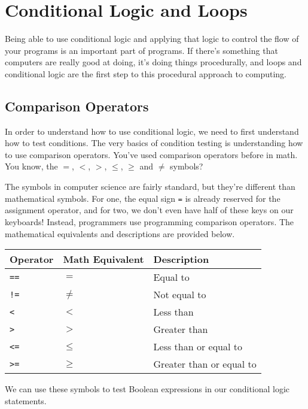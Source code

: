 \chapter{Conditional Logic and Loops}
Being able to use conditional logic and applying that logic to control the flow of your programs is an important part of programs. If there's something that computers are really good at doing, it's doing things procedurally, and loops and conditional logic are the first step to this procedural approach to computing.\par
\section{Comparison Operators}
In order to understand how to use conditional logic, we need to first understand how to test conditions. The very basics of condition testing is understanding how to use comparison operators. You've used comparison operators before in math. You know, the $=$, $<$, $>$, $\leq$, $\geq$ and $\neq$ symbols?\par
The symbols in computer science are fairly standard, but they're different than mathematical symbols. For one, the equal sign \verb|=| is already reserved for the assignment operator, and for two, we don't even have half of these keys on our keyboards! Instead, programmers use programming comparison operators. The mathematical equivalents and descriptions are provided below.\par
\vspace{5mm}
\begin{tabular}{|l|l|l|}
\hline
Operator  & Math Equivalent & Description              \\
\hline
\verb|==| & $=$             & Equal to                 \\
\hline
\verb|!=| & $\neq$          & Not equal to             \\
\hline
\verb|<|  & $<$             & Less than                \\
\hline
\verb|>|  & $>$             & Greater than             \\
\hline
\verb|<=| & $\leq$          & Less than or equal to    \\
\hline
\verb|>=| & $\geq$          & Greater than or equal to \\
\hline
\end{tabular}\par
\vspace{5mm}
We can use these symbols to test Boolean expressions in our conditional logic statements.\par
